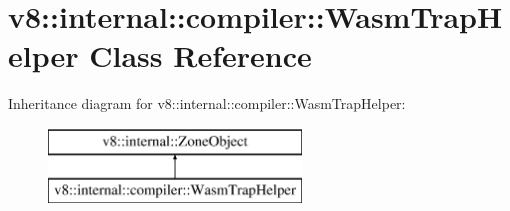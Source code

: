 \hypertarget{classv8_1_1internal_1_1compiler_1_1_wasm_trap_helper}{}\section{v8\+:\+:internal\+:\+:compiler\+:\+:Wasm\+Trap\+Helper Class Reference}
\label{classv8_1_1internal_1_1compiler_1_1_wasm_trap_helper}
Inheritance diagram for v8\+:\+:internal\+:\+:compiler\+:\+:Wasm\+Trap\+Helper\+:\begin{figure}[H]
\begin{center}
\leavevmode
\includegraphics[height=2.000000cm]{classv8_1_1internal_1_1compiler_1_1_wasm_trap_helper}
\end{center}
\end{figure}
